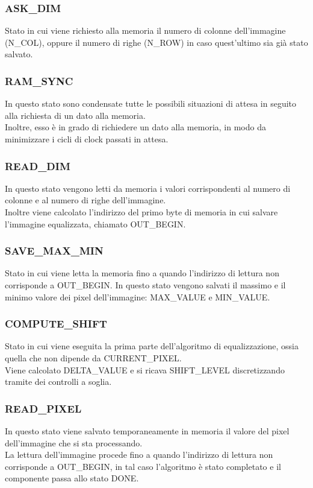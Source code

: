 \documentclass[a4paper, 12pt]{article}
\begin{document}
\subsubsection{ASK\_DIM}
Stato in cui viene richiesto alla memoria il numero di colonne dell'immagine (N\_COL), oppure il numero di righe (N\_ROW) in caso quest'ultimo sia già stato salvato.
\subsubsection{RAM\_SYNC}
In questo stato sono condensate tutte le possibili situazioni di attesa in seguito alla richiesta di un dato alla memoria. \\
Inoltre, esso è in grado di richiedere un dato alla memoria, in modo da minimizzare i cicli di clock passati in attesa.
\subsubsection{READ\_DIM}
In questo stato vengono letti da memoria i valori corrispondenti al numero di colonne e al numero di righe dell'immagine. \\
Inoltre viene calcolato l'indirizzo del primo byte di memoria in cui salvare l'immagine equalizzata, chiamato OUT\_BEGIN.
\subsubsection{SAVE\_MAX\_MIN}
Stato in cui viene letta la memoria fino a quando l'indirizzo di lettura non corrisponde a OUT\_BEGIN.
In questo stato vengono salvati il massimo e il minimo valore dei pixel dell'immagine: MAX\_VALUE e MIN\_VALUE.
\subsubsection{COMPUTE\_SHIFT}
Stato in cui viene eseguita la prima parte dell'algoritmo di equalizzazione, ossia quella che non dipende da CURRENT\_PIXEL. \\
Viene calcolato DELTA\_VALUE e si ricava SHIFT\_LEVEL discretizzando tramite dei controlli a soglia.
\subsubsection{READ\_PIXEL}
In questo stato viene salvato temporaneamente in memoria il valore del pixel dell'immagine che si sta processando. \\
La lettura dell'immagine procede fino a quando l'indirizzo di lettura non corrisponde a OUT\_BEGIN, in tal caso l'algoritmo è stato completato e il componente passa allo stato DONE.
\end{document}
